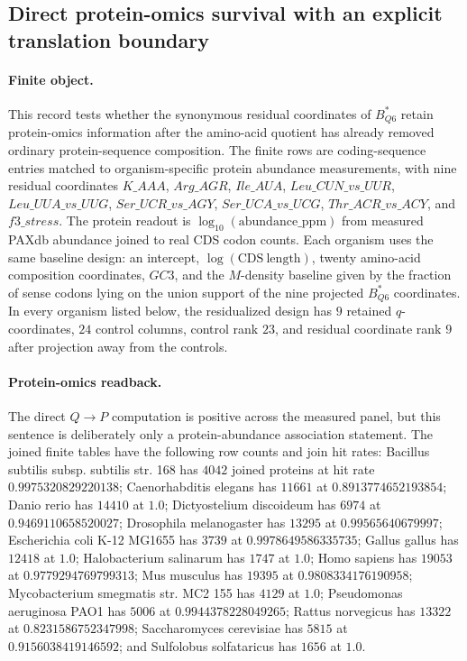 \subsection{Direct protein-omics survival with an explicit translation boundary}\label{sec:q6-direct-protein-omics-survival-with-translation-boundary-cross-layer}

\paragraph{Finite object.}
This record tests whether the synonymous residual coordinates of $B^*_{Q6}$ retain protein-omics information after the amino-acid quotient has already removed ordinary protein-sequence composition.  The finite rows are coding-sequence entries matched to organism-specific protein abundance measurements, with nine residual coordinates
$K\_AAA$, $Arg\_AGR$, $Ile\_AUA$, $Leu\_CUN\_vs\_UUR$, $Leu\_UUA\_vs\_UUG$, $Ser\_UCR\_vs\_AGY$, $Ser\_UCA\_vs\_UCG$, $Thr\_ACR\_vs\_ACY$, and $f3\_stress$.  The protein readout is $\log_{10}(\mathrm{abundance\_ppm})$ from measured PAXdb abundance joined to real CDS codon counts.  Each organism uses the same baseline design: an intercept, $\log(\mathrm{CDS\ length})$, twenty amino-acid composition coordinates, $GC3$, and the $M$-density baseline given by the fraction of sense codons lying on the union support of the nine projected $B^*_{Q6}$ coordinates.  In every organism listed below, the residualized design has $9$ retained $q$-coordinates, $24$ control columns, control rank $23$, and residual coordinate rank $9$ after projection away from the controls.

\paragraph{Protein-omics readback.}
The direct $Q \to P$ computation is positive across the measured panel, but this sentence is deliberately only a protein-abundance association statement.  The joined finite tables have the following row counts and join hit rates: Bacillus subtilis subsp. subtilis str. 168 has $4042$ joined proteins at hit rate $0.9975320829220138$; Caenorhabditis elegans has $11661$ at $0.8913774652193854$; Danio rerio has $14410$ at $1.0$; Dictyostelium discoideum has $6974$ at $0.9469110658520027$; Drosophila melanogaster has $13295$ at $0.99565640679997$; Escherichia coli K-12 MG1655 has $3739$ at $0.9978649586335735$; Gallus gallus has $12418$ at $1.0$; Halobacterium salinarum has $1747$ at $1.0$; Homo sapiens has $19053$ at $0.9779294769799313$; Mus musculus has $19395$ at $0.9808334176190958$; Mycobacterium smegmatis str. MC2 155 has $4129$ at $1.0$; Pseudomonas aeruginosa PAO1 has $5006$ at $0.9944378228049265$; Rattus norvegicus has $13322$ at $0.8231586752347998$; Saccharomyces cerevisiae has $5815$ at $0.9156038419146592$; and Sulfolobus solfataricus has $1656$ at $1.0$.

